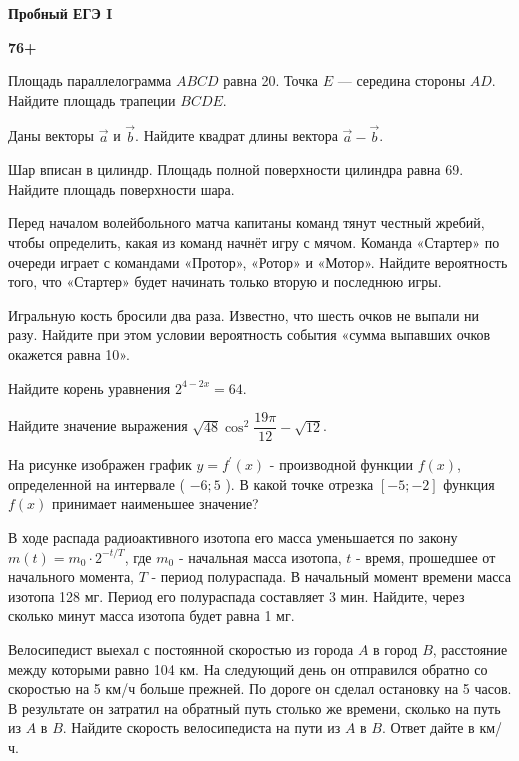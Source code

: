 \centerline{\bf \Huge Пробный ЕГЭ I}
\centerline{\bf \Huge }

\begin{flushright}
        \scriptsize{\textbf{76+}}
\end{flushright}

 Площадь параллелограмма $ABCD$ равна 20. Точка $E$ — середина стороны $AD$. Найдите площадь трапеции $BCDE$.

 Даны векторы $\vec{a}$ и $\vec{b}$. Найдите квадрат длины вектора $\vec{a} - \vec{b}$.

 Шар вписан в цилиндр. Площадь полной поверхности цилиндра равна 69. Найдите площадь поверхности шара.

 Перед началом волейбольного матча капитаны команд тянут честный жребий, чтобы определить, какая из команд начнёт игру с мячом. Команда «Стартер» по очереди играет с командами «Протор», «Ротор» и «Мотор». Найдите вероятность того, что «Стартер» будет начинать только вторую и последнюю игры.

 Игральную кость бросили два раза. Известно, что шесть очков не выпали ни разу. Найдите при этом условии вероятность события «сумма выпавших очков окажется равна 10».

 Найдите корень уравнения $2^{4-2 x}=64$.


 Найдите значение выражения $\sqrt{48} \cos ^2 \dfrac{19 \pi}{12}-\sqrt{12}$.

 На рисунке изображен график $y=f^{\prime}(x)$ - производной функции $f(x)$, определенной на интервале ( $-6 ; 5$ ). В какой точке отрезка $[-5 ;-2]$ функция $f(x)$ принимает наименьшее значение?

 В ходе распада радиоактивного изотопа его масса уменьшается по закону $m(t)=m_0 \cdot 2^{-t / T}$, где $m_0$ - начальная масса изотопа, $t$ - время, прошедшее от начального момента, $T$ - период полураспада. В начальный момент времени масса изотопа 128 мг. Период его полураспада составляет 3 мин. Найдите, через сколько минут масса изотопа будет равна 1 мг.

\newpage

 Велосипедист выехал с постоянной скоростью из города $A$ в город $B$, расстояние между которыми равно 104 км. На следующий день он отправился обратно со скоростью на 5 км/ч больше прежней. По дороге он сделал остановку на 5 часов. В результате он затратил на обратный путь столько же времени, сколько на путь из $A$ в $B$. Найдите скорость велосипедиста на пути из $A$ в $B$. Ответ дайте в км/ч.



